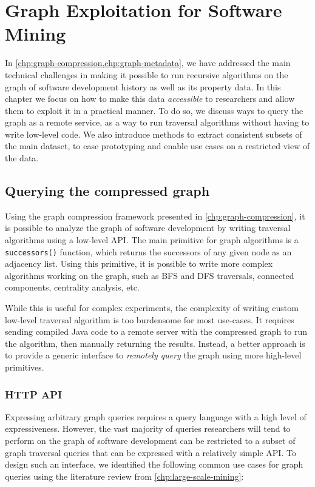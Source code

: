 \chapter{Graph Exploitation for Software Mining}%
\label{chp:graph-exploitation}

In \cref{chp:graph-compression,chp:graph-metadata}, we have addressed the main
technical challenges in making it possible to run recursive algorithms on the
graph of software development history as well as its property data. In this
chapter we focus on how to make this data \emph{accessible} to researchers and
allow them to exploit it in a practical manner. To do so, we discuss ways to
query the graph as a remote service, as a way to run traversal algorithms
without having to write low-level code. We also introduce methods to extract
consistent subsets of the main dataset, to ease prototyping and enable use
cases on a restricted view of the data.

\section{Querying the compressed graph}
\label{sec:graph-querying}

Using the graph compression framework presented in
\cref{chp:graph-compression}, it is possible to analyze the graph of software
development by writing traversal algorithms using a low-level API\@. The main
primitive for graph algorithms is a \texttt{successors()} function, which
returns the successors of any given node as an adjacency list. Using this
primitive, it is possible to write more complex algorithms working on the
graph, such as \gls{BFS} and \gls{DFS} traversals, connected components,
centrality analysis, etc.

While this is useful for complex experiments, the complexity of writing custom
low-level traversal algorithm is too burdensome for most use-cases. It
requires sending compiled Java code to a remote server with the compressed
graph to run the algorithm, then manually returning the results. Instead, a
better approach is to provide a generic interface to \emph{remotely query} the
graph using more high-level primitives.

\subsection{HTTP API}

Expressing arbitrary graph queries requires a query language with a high level
of expressiveness. However, the vast majority of queries researchers will tend
to perform on the graph of software development can be restricted to a subset
of graph traversal queries that can be expressed with a relatively simple
API\@. To design such an interface, we identified the following common use
cases for graph queries using the literature review from
\cref{chp:large-scale-mining}:

